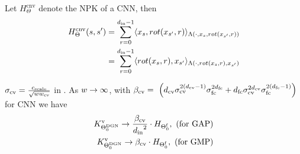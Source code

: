\begin{lemma}\label{lm:cnnnpk}
Let $H^{\text{cnv}}_{\Theta}$ denote the NPK of a CNN, then 
\begin{align*}
H^{\text{cnv}}_{\Theta}(s,s')&=\sum_{r=0}^{d_{\text{in}}-1} \langle x_s,rot(x_{s'},r)\rangle_{\Lambda(\cdot, x_s,rot(x_{s'},r))}\\&=\sum_{r=0}^{d_{\text{in}}-1} \langle rot(x_s,r),x_{s'}\rangle_{\Lambda(\cdot, rot(x_s,r),x_{s'})}
\end{align*}
\end{lemma}

\begin{theorem}\label{th:main} $\sigma_{\text{cv}}=\frac{c_{\text{scale}}}{\sqrt{ww_{\text{cv}}}}$  in . As $w\rightarrow\infty$, with  $\beta_{\text{cv}} = \ \left(d_{\text{cv}} \sigma_{\text{cv}}^{2(d_{\text{cv}}-1)}\sigma_{\text{fc}}^{2d_{\text{fc}}}+d_{\text{fc}} \sigma_{\text{cv}}^{2d_{\text{cv}}}\sigma_{\text{fc}}^{2(d_{\text{fc}}-1)}\right)$ for CNN we have
\begin{align*}
K^{\text{v}}_{\Theta^{\text{DGN}}_0}\rightarrow \frac{\beta_{\text{cv}}}{{d_{\text{in}}}^2} \cdot H_{\Theta^{\textrm{f}}_0},\,\,\text{(for GAP)}\\
K^{\text{v}}_{\Theta^{\text{DGN}}_0}\rightarrow {\beta_{\text{cv}}} \cdot H_{\Theta^{\textrm{f}}_0},\,\,\text{(for GMP)}\\
\end{align*}
\end{theorem}

